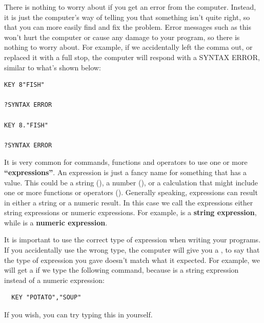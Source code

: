 There is nothing to worry about if you get an error from the computer.
Instead, it is just the computer's way of telling you that something
isn't quite right, so that you can more easily
find and fix the problem.
Error messages such as this won't hurt the computer or cause any damage to your program,
so there is nothing to worry about.
For example, if we accidentally left the comma out, or replaced it with
a full stop, the computer will respond with
a SYNTAX ERROR, similar to what's shown below:

\newpage
\begin{tcolorbox}[colback=black,coltext=white]
\verbatimfont{\codefont}
\begin{verbatim}
KEY 8"FISH"

?SYNTAX ERROR

KEY 8."FISH"

?SYNTAX ERROR
\end{verbatim}
\end{tcolorbox}


It is very common for commands, functions and operators to use one or
more {\bf``expressions''}.
An expression is just a fancy name for something that has a value.
This could be a string (), a number
(), or a calculation that might include
one or more functions or operators ().
Generally speaking, expressions can result in either a string or a numeric result.
In this case we call the expressions either string expressions or numeric expressions.
For example,  is a {\bf string expression}, while
 is a {\bf numeric expression}.

It is important to use the correct type of expression when writing your programs.
If you accidentally use the wrong type, the computer will give you a
, to say that the type
of expression you gave doesn't match what it expected. For example, we will get a
 if we type the following command,
because  is a string expression instead of a numeric expression:

\begin{tcolorbox}[colback=black,coltext=white]
\verbatimfont{\codefont}
\begin{verbatim}
  KEY "POTATO","SOUP"
\end{verbatim}
\end{tcolorbox}

If you wish, you can try typing this in yourself.


